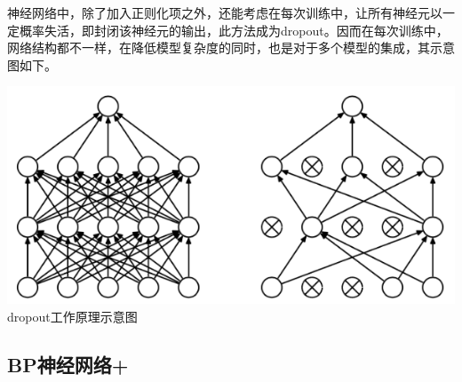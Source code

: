神经网络中，除了加入正则化项之外，还能考虑在每次训练中，让所有神经元以一定概率失活，即封闭该神经元的输出，此方法成为dropout。因而在每次训练中，网络结构都不一样，在降低模型复杂度的同时，也是对于多个模型的集成，其示意图如下。
\begin{center}
\includegraphics[scale=0.5]{../figures/dropout.png} \\
dropout工作原理示意图
\end{center}
\subsection{BP神经网络+}
